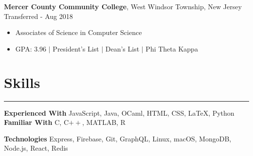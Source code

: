 \documentclass[10pt]{article}
\newcommand{\resumesection}[1]{\vspace{-0.2cm}\section*{#1}\vspace{-0.2cm}\hrule\vspace{0.2cm}}
\begin{document}
\textbf{Mercer County Community College}, West Windsor Township, New Jersey \hfill Transferred - Aug 2018
\begin{itemize}
	\item[] Associates of Science in Computer Science
	\item[] GPA: 3.96 $\vert$ President's List $\vert$ Dean's List $\vert$ Phi Theta Kappa
\end{itemize}


\resumesection{Skills}
\textbf{Experienced With} JavaScript, Java, OCaml, HTML, CSS, \LaTeX, Python \quad \textbf{Familiar With} C, C$++$, MATLAB, R



\textbf{Technologies} Express, Firebase, Git, GraphQL, Linux, macOS, MongoDB, Node.js, React, Redis



%
\end{document}

